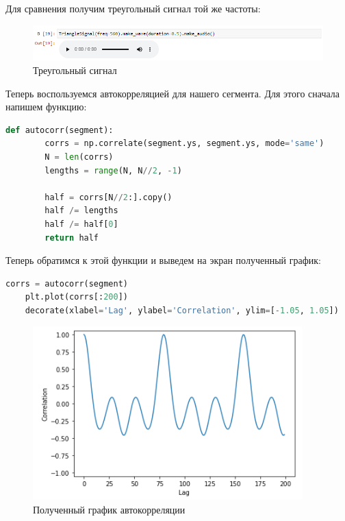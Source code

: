 \documentclass[a4paper]{article}
\begin{document}
            Для сравнения получим треугольный сигнал той же частоты:
            
            \begin{figure}[H]
                \centering
                \includegraphics[width=\textwidth]{ex_4_triangle_audio.png}
                \caption{Треугольный сигнал}
                \label{fig:ex_4_triangle_audio}
            \end{figure}
            
            Теперь воспользуемся автокорреляцией для нашего сегмента. Для этого сначала напишем функцию:
            
\begin{lstlisting}[language=Python, caption= Функция для автокорреляции]
    def autocorr(segment):
        corrs = np.correlate(segment.ys, segment.ys, mode='same')
        N = len(corrs)
        lengths = range(N, N//2, -1)
    
        half = corrs[N//2:].copy()
        half /= lengths
        half /= half[0]
        return half
\end{lstlisting}
            
            Теперь обратимся к этой функции и выведем на экран полученный график:
            
\begin{lstlisting}[language=Python, caption= Получение графика автокорреляции]
    corrs = autocorr(segment)
    plt.plot(corrs[:200])
    decorate(xlabel='Lag', ylabel='Correlation', ylim=[-1.05, 1.05])
\end{lstlisting}               
            
            \begin{figure}[H]
                \centering
                \includegraphics{ex_4_spectr_autocorr.png}
                \caption{Полученный график автокорреляции}
                \label{fig:ex_4_spectr_autocorr}
            \end{figure}
            
\end{document}
